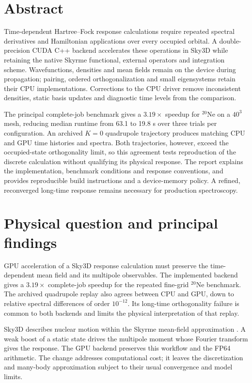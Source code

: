 \documentclass[11pt,a4paper]{article}
\newcommand{\Ne}{\texorpdfstring{\ensuremath{^{20}\mathrm{Ne}}}{20Ne}}
\newcommand{\sepsection}[1]{\FloatBarrier\section{#1}}
\begin{document}
\section*{Abstract}
Time-dependent Hartree--Fock response calculations require repeated
spectral derivatives and Hamiltonian applications over every occupied
orbital. A double-precision CUDA C++ backend accelerates these operations
in Sky3D while retaining the native Skyrme functional, external operators
and integration scheme. Wavefunctions, densities and mean fields remain
on the device during propagation; pairing, ordered orthogonalization and
small eigensystems retain their CPU implementations. Corrections to the
CPU driver remove inconsistent densities, static basis updates and
diagnostic time levels from the comparison.

The principal complete-job benchmark gives a $3.19\times$ speedup for
\Ne{} on a $40^3$ mesh, reducing median runtime from 63.1 to 19.8 s
over three trials per configuration. An archived $K=0$ quadrupole
trajectory produces matching CPU and GPU time histories and spectra.
Both trajectories, however, exceed the occupied-state orthogonality
limit, so this agreement tests reproduction of the discrete calculation
without qualifying its physical response. The report explains the
implementation, benchmark conditions and response conventions, and
provides reproducible build instructions and a device-memory policy.
A refined, reconverged long-time response remains necessary for
production spectroscopy.

\clearpage
{\small\setlength{\parskip}{0pt}\tableofcontents}
\clearpage
\listoffigures
\listoftables

\clearpage{}
\sepsection{Physical question and principal findings}
\label{sec:scope}
GPU acceleration of a Sky3D response calculation must preserve the
time-dependent mean field and its multipole observables.
The implemented backend gives a $3.19\times$ complete-job speedup for the
repeated fine-grid \Ne{} benchmark. The archived quadrupole replay
also agrees between CPU and GPU, down to relative spectral differences
of order $10^{-12}$. Its long-time orthogonality failure is common to
both backends and limits the physical interpretation of that replay.

Sky3D describes nuclear motion within the Skyrme mean-field approximation
\cite{sky3d,sky3d12}. A weak boost of a static state drives the multipole
moment whose Fourier transform gives the response. The GPU backend
preserves this workflow and the FP64 arithmetic. The change addresses
computational cost; it leaves the discretization and many-body
approximation subject to their usual convergence and model limits.
\end{document}
